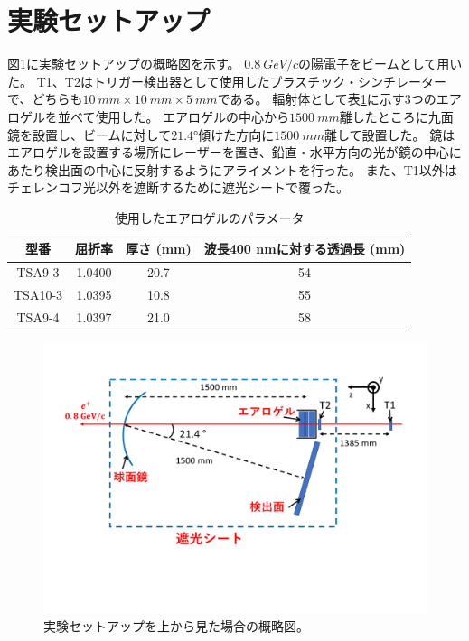 \section{実験セットアップ}
図\ref{fig:ELPHSetup}に実験セットアップの概略図を示す。
$\SI{0.8}{GeV/c}$の陽電子をビームとして用いた。
T1、T2はトリガー検出器として使用したプラスチック・シンチレーターで、どちらも$\SI{10}{mm}\times\SI{10}{mm}\times\SI{5}{mm}$である。
輻射体として表\ref{table:Aerogel}に示す3つのエアロゲルを並べて使用した。
エアロゲルの中心から$\SI{1500}{mm}$離したところに九面鏡を設置し、ビームに対して$\ang{21.4}$傾けた方向に$\SI{1500}{mm}$離して設置した。
鏡はエアロゲルを設置する場所にレーザーを置き、鉛直・水平方向の光が鏡の中心にあたり検出面の中心に反射するようにアライメントを行った。
また、T1以外はチェレンコフ光以外を遮断するために遮光シートで覆った。

\begin{table}[htbp]
  \caption{使用したエアロゲルのパラメータ}
  \label{table:Aerogel}
  \centering
  \begin{tabular}{cccc}
    \hline
    型番      & 屈折率    & 厚さ (mm) & 波長400 nmに対する透過長 (mm) \\
    \hline\hline
    TSA9-3  & 1.0400 & 20.7    & 54                   \\
    TSA10-3 & 1.0395 & 10.8    & 55                   \\
    TSA9-4  & 1.0397 & 21.0    & 58                   \\
    \hline
  \end{tabular}
\end{table}


\begin{figure}
  \centering
  \includegraphics[width=15cm]{images/chapter3/ELPHSetup.pdf}
  \caption{実験セットアップを上から見た場合の概略図。}
  \label{fig:ELPHSetup}
\end{figure}